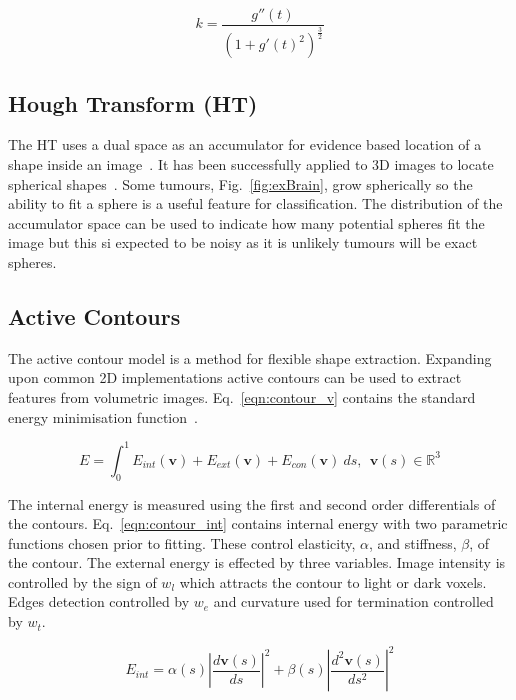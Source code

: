 \documentclass[journal]{IEEEtran}
\begin{document}
\begin{equation}
	k = \frac{g''(t)}{(1 + g'(t)^2)^{\frac{3}{2}}}
	\label{eqn:curv}
\end{equation}


\subsection{Hough Transform (HT)}

The HT uses a dual space as an accumulator for evidence based location of a shape inside an image~\cite{nixon02feature}.
It has been successfully applied to 3D images to locate spherical shapes~\cite{abuzaina13hough}.
Some tumours, Fig.~\ref{fig:exBrain}, grow spherically so the ability to fit a sphere is a useful feature for classification.
The distribution of the accumulator space can be used to indicate how many potential spheres fit the image but this si expected to be noisy as it is unlikely tumours will be exact spheres.





\subsection{Active Contours}

The active contour model is a method for flexible shape extraction.
Expanding upon common 2D implementations active contours can be used to extract features from volumetric images.
Eq.~\eqref{eqn:contour_v} contains the standard energy minimisation function~\cite{nixon02feature,skalski13automatic}. 

\begin{equation}
	E = \int_0^{1} E_{int}(\mathbf{v}) + E_{ext}(\mathbf{v}) + E_{con}(\mathbf{v})\:ds,\:\:\mathbf{v}(s) \in \mathbb{R}^3
	\label{eqn:contour_v}
\end{equation}

The internal energy is measured using the first and second order differentials of the contours.
Eq.~\eqref{eqn:contour_int} contains internal energy with two parametric functions chosen prior to fitting.
These control elasticity, $\alpha$, and stiffness, $\beta$, of the contour.
The external energy is effected by three variables.
Image intensity is controlled by the sign of $w_l$ which attracts the contour to light or dark voxels.
Edges detection controlled by $w_e$ and curvature used for termination controlled by $w_t$. 

\begin{equation}
	 E_{int}= \alpha(s)\left|\frac{d\mathbf{v}(s)}{ds}\right|^2 + \beta(s)\left|\frac{d^2\mathbf{v}(s)}{ds^2}\right|^2 
	 \label{eqn:contour_int}
\end{equation}
\end{document}
